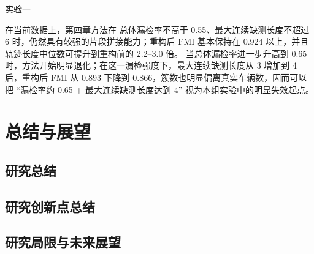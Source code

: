 \documentclass{xdupgthesis}
\begin{document}

实验一

在当前数据上，第四章方法在 总体漏检率不高于 0.55、最大连续缺测长度不超过 6 时，仍然具有较强的片段拼接能力；重构后 FMI 基本保持在 0.924 以上，并且轨迹长度中位数可提升到重构前的 2.2–3.0 倍。
当总体漏检率进一步升高到 0.65 时，方法开始明显退化；在这一漏检强度下，最大连续缺测长度从 3 增加到 4 后，重构后 FMI 从 0.893 下降到 0.866，簇数也明显偏离真实车辆数，因而可以把 “漏检率约 0.65 + 最大连续缺测长度达到 4” 视为本组实验中的明显失效起点。





\chapter{总结与展望}

\section{研究总结}



\section{研究创新点总结}



\section{研究局限与未来展望}
\end{document}
